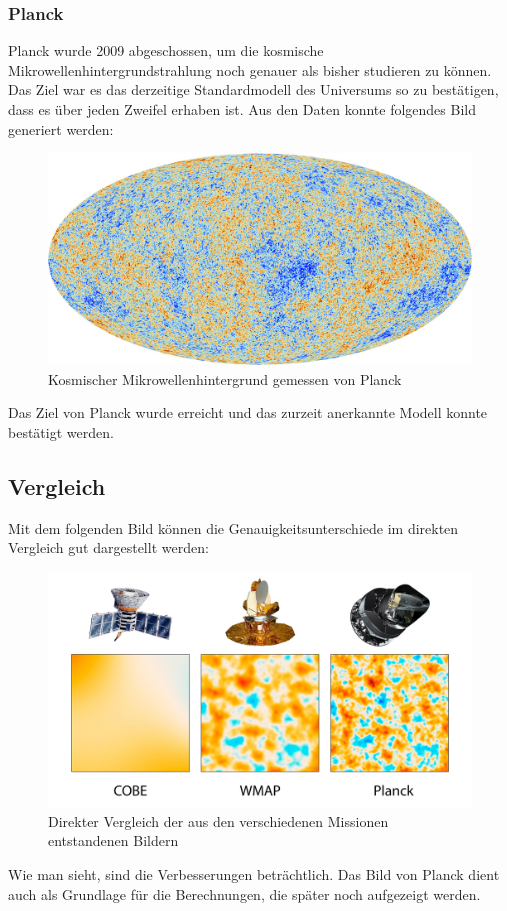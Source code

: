 	\subsubsection{Planck}
	Planck wurde 2009 abgeschossen, um die kosmische Mikrowellenhintergrundstrahlung noch genauer als bisher studieren zu können.
	Das Ziel war es das derzeitige Standardmodell des Universums so zu bestätigen, dass es über jeden Zweifel erhaben ist.
	Aus den Daten konnte folgendes Bild generiert werden:
	\begin{figure}
		\includegraphics[scale=1]{cmb/images/CMB_Planck.jpg}
		\caption{Kosmischer Mikrowellenhintergrund gemessen von Planck}
		\label{fig:CMB_Planck}
	\end{figure}
	Das Ziel von Planck wurde erreicht und das zurzeit anerkannte Modell konnte bestätigt werden.
	
	\subsection{Vergleich}
	Mit dem folgenden Bild können die Genauigkeitsunterschiede im direkten Vergleich gut dargestellt werden:
	\begin{figure}
		\includegraphics[scale=1]{cmb/images/COBE_WMAP_Planck.jpg}
		\caption{Direkter Vergleich der aus den verschiedenen Missionen entstandenen Bildern}
		\label{fig:COBE_WMAP_PLANCK}
	\end{figure}
	Wie man sieht, sind die Verbesserungen beträchtlich.
	Das Bild von Planck dient auch als Grundlage für die Berechnungen, die später noch aufgezeigt werden.
	

